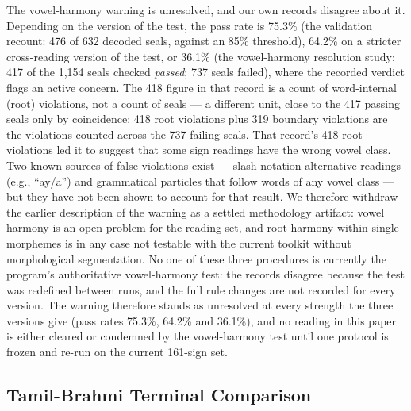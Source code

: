 \documentclass[11pt]{article}
\begin{document}
The vowel-harmony warning is unresolved, and our own records disagree about it. Depending on the version of the test, the pass rate is 75.3\% (the validation recount: 476 of 632 decoded seals, against an 85\% threshold), 64.2\% on a stricter cross-reading version of the test, or 36.1\% (the vowel-harmony resolution study: 417 of the 1,154 seals checked \emph{passed}; 737 seals failed), where the recorded verdict flags an active concern. The 418 figure in that record is a count of word-internal (root) violations, not a count of seals --- a different unit, close to the 417 passing seals only by coincidence: 418 root violations plus 319 boundary violations are the violations counted across the 737 failing seals. That record's 418 root violations led it to suggest that some sign readings have the wrong vowel class. Two known sources of false violations exist --- slash-notation alternative readings (e.g., ``ay/ā'') and grammatical particles that follow words of any vowel class --- but they have not been shown to account for that result. We therefore withdraw the earlier description of the warning as a settled methodology artifact: vowel harmony is an open problem for the reading set, and root harmony within single morphemes is in any case not testable with the current toolkit without morphological segmentation. No one of these three procedures is currently the program's authoritative vowel-harmony test: the records disagree because the test was redefined between runs, and the full rule changes are not recorded for every version. The warning therefore stands as unresolved at every strength the three versions give (pass rates 75.3\%, 64.2\% and 36.1\%), and no reading in this paper is either cleared or condemned by the vowel-harmony test until one protocol is frozen and re-run on the current 161-sign set.

\subsection{Tamil-Brahmi Terminal Comparison }\label{tamil-brahmi-terminal-cross-validation-phase-155}
\end{document}
